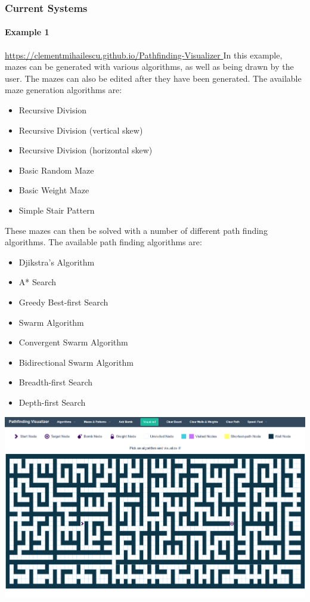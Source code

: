 \documentclass[titlepage]{article}
\begin{document}
\subsubsection{Current Systems}
\paragraph{Example 1}
\href{https://clementmihailescu.github.io/Pathfinding-Visualizer/
}{https://clementmihailescu.github.io/Pathfinding-Visualizer
}
\newline
In this example, mazes can be generated with various algorithms, as well as being drawn by the user. The mazes can also be edited after they have been generated. The available maze generation algorithms are:
\begin{itemize}
    \item Recursive Division
    \item Recursive Division (vertical skew)
    \item Recursive Division (horizontal skew)
    \item Basic Random Maze
    \item Basic Weight Maze
    \item Simple Stair Pattern
\end{itemize}
These mazes can then be solved with a number of different path finding algorithms. The available path finding algorithms are:
\begin{itemize}
    \item Djikstra's Algorithm
    \item A* Search
    \item Greedy Best-first Search
    \item Swarm Algorithm
    \item Convergent Swarm Algorithm
    \item Bidirectional Swarm Algorithm
    \item Breadth-first Search
    \item Depth-first Search
\end{itemize}
\includegraphics[width=\linewidth]{assets/Existing Solutions/example 1.PNG}
\end{document}
